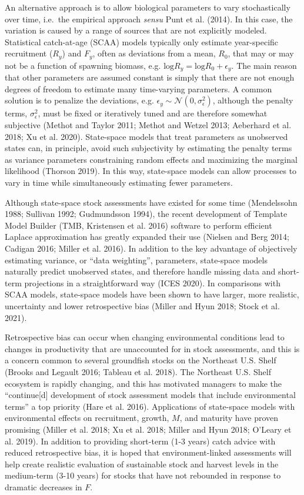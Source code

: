 \documentclass[]{article}
\begin{document}
An alternative approach is to allow biological parameters to vary
stochastically over time, i.e.~the empirical approach \emph{sensu} Punt
et al. (2014). In this case, the variation is caused by a range of
sources that are not explicitly modeled. Statistical catch-at-age (SCAA)
models typically only estimate year-specific recruitment (\(R_y\)) and
\(F_y\), often as deviations from a mean, \(R_0\), that may or may not
be a function of spawning biomass, e.g.
\(\text{log}R_y = \text{log}R_0 + \epsilon_y\). The main reason that
other parameters are assumed constant is simply that there are not
enough degrees of freedom to estimate many time-varying parameters. A
common solution is to penalize the deviations, e.g.
\(\epsilon_y \sim \mathcal{N}(0,\sigma^2_\epsilon)\), although the
penalty terms, \(\sigma^2_\epsilon\), must be fixed or iteratively tuned
and are therefore somewhat subjective (Methot and Taylor 2011; Methot
and Wetzel 2013; Aeberhard et al. 2018; Xu et al. 2020). State-space
models that treat parameters as unobserved states can, in principle,
avoid such subjectivity by estimating the penalty terms as variance
parameters constraining random effects and maximizing the marginal
likelihood (Thorson 2019). In this way, state-space models can allow
processes to vary in time while simultaneously estimating fewer
parameters.

Although state-space stock assessments have existed for some time
(Mendelssohn 1988; Sullivan 1992; Gudmundsson 1994), the recent
development of Template Model Builder (TMB, Kristensen et al. 2016)
software to perform efficient Laplace approximation has greatly expanded
their use (Nielsen and Berg 2014; Cadigan 2016; Miller et al. 2016). In
addition to the key advantage of objectively estimating variance, or
``data weighting'', parameters, state-space models naturally predict
unobserved states, and therefore handle missing data and short-term
projections in a straightforward way (ICES 2020). In comparisons with
SCAA models, state-space models have been shown to have larger, more
realistic, uncertainty and lower retrospective bias (Miller and Hyun
2018; Stock et al. 2021).

Retrospective bias can occur when changing environmental conditions lead
to changes in productivity that are unaccounted for in stock
assessments, and this is a concern common to several groundfish stocks
on the Northeast U.S. Shelf (Brooks and Legault 2016; Tableau et al.
2018). The Northeast U.S. Shelf ecosystem is rapidly changing, and this
has motivated managers to make the ``continue{[}d{]} development of
stock assessment models that include environmental terms'' a top
priority (Hare et al. 2016). Applications of state-space models with
environmental effects on recruitment, growth, \(M\), and maturity have
proven promising (Miller et al. 2018; Xu et al. 2018; Miller and Hyun
2018; O'Leary et al. 2019). In addition to providing short-term (1-3
years) catch advice with reduced retrospective bias, it is hoped that
environment-linked assessments will help create realistic evaluation of
sustainable stock and harvest levels in the medium-term (3-10 years) for
stocks that have not rebounded in response to dramatic decreases in
\(F\).
\end{document}

